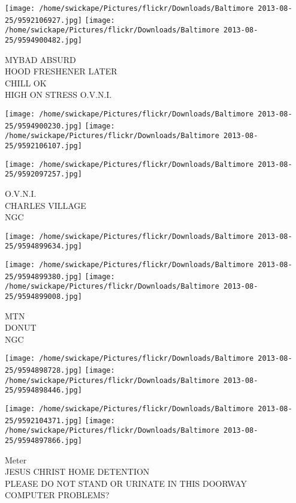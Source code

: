 \documentclass[10pt,letterpaper]{article}
\begin{document}
\texttt{[image: /home/swickape/Pictures/flickr/Downloads/Baltimore 2013-08-25/9592106927.jpg]}
\texttt{[image: /home/swickape/Pictures/flickr/Downloads/Baltimore 2013-08-25/9594900482.jpg]}

MYBAD ABSURD\\
HOOD FRESHENER LATER\\
CHILL OK\\
HIGH ON STRESS O.V.N.I.\\
\pagebreak

\texttt{[image: /home/swickape/Pictures/flickr/Downloads/Baltimore 2013-08-25/9594900230.jpg]}
\texttt{[image: /home/swickape/Pictures/flickr/Downloads/Baltimore 2013-08-25/9592106107.jpg]}

\texttt{[image: /home/swickape/Pictures/flickr/Downloads/Baltimore 2013-08-25/9592097257.jpg]}

O.V.N.I.\\
CHARLES VILLAGE\\
NGC\\
\pagebreak

\texttt{[image: /home/swickape/Pictures/flickr/Downloads/Baltimore 2013-08-25/9594899634.jpg]}

\vspace{0.25in}
\texttt{[image: /home/swickape/Pictures/flickr/Downloads/Baltimore 2013-08-25/9594899380.jpg]}
\texttt{[image: /home/swickape/Pictures/flickr/Downloads/Baltimore 2013-08-25/9594899008.jpg]}

MTN\\
DONUT\\
NGC\\
\pagebreak

\texttt{[image: /home/swickape/Pictures/flickr/Downloads/Baltimore 2013-08-25/9594898728.jpg]}
\texttt{[image: /home/swickape/Pictures/flickr/Downloads/Baltimore 2013-08-25/9594898446.jpg]}

\texttt{[image: /home/swickape/Pictures/flickr/Downloads/Baltimore 2013-08-25/9592104371.jpg]}
\texttt{[image: /home/swickape/Pictures/flickr/Downloads/Baltimore 2013-08-25/9594897866.jpg]}

Meter\\
JESUS CHRIST HOME DETENTION\\
PLEASE DO NOT STAND OR URINATE IN THIS DOORWAY\\
COMPUTER PROBLEMS?\\
\pagebreak
\end{document}
